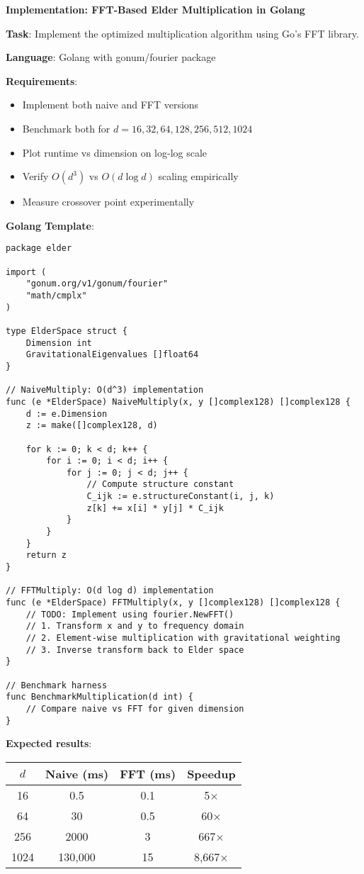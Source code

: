 \begin{coding}
\textbf{Implementation: FFT-Based Elder Multiplication in Golang}

\textbf{Task}: Implement the optimized multiplication algorithm using Go's FFT library.

\textbf{Language}: Golang with gonum/fourier package

\textbf{Requirements}:
\begin{itemize}
\item Implement both naive and FFT versions
\item Benchmark both for $d = 16, 32, 64, 128, 256, 512, 1024$
\item Plot runtime vs dimension on log-log scale
\item Verify $O(d^3)$ vs $O(d \log d)$ scaling empirically
\item Measure crossover point experimentally
\end{itemize}

\textbf{Golang Template}:
\begin{lstlisting}[style=golang]
package elder

import (
    "gonum.org/v1/gonum/fourier"
    "math/cmplx"
)

type ElderSpace struct {
    Dimension int
    GravitationalEigenvalues []float64
}

// NaiveMultiply: O(d^3) implementation
func (e *ElderSpace) NaiveMultiply(x, y []complex128) []complex128 {
    d := e.Dimension
    z := make([]complex128, d)
    
    for k := 0; k < d; k++ {
        for i := 0; i < d; i++ {
            for j := 0; j < d; j++ {
                // Compute structure constant
                C_ijk := e.structureConstant(i, j, k)
                z[k] += x[i] * y[j] * C_ijk
            }
        }
    }
    return z
}

// FFTMultiply: O(d log d) implementation  
func (e *ElderSpace) FFTMultiply(x, y []complex128) []complex128 {
    // TODO: Implement using fourier.NewFFT()
    // 1. Transform x and y to frequency domain
    // 2. Element-wise multiplication with gravitational weighting
    // 3. Inverse transform back to Elder space
}

// Benchmark harness
func BenchmarkMultiplication(d int) {
    // Compare naive vs FFT for given dimension
}
\end{lstlisting}

\textbf{Expected results}:
\begin{center}
\begin{tabular}{|c|c|c|c|}
\hline
$d$ & Naive (ms) & FFT (ms) & Speedup \\
\hline
16 & 0.5 & 0.1 & 5× \\
64 & 30 & 0.5 & 60× \\
256 & 2000 & 3 & 667× \\
1024 & 130,000 & 15 & 8,667× \\
\hline
\end{tabular}
\end{center}


\end{coding}
